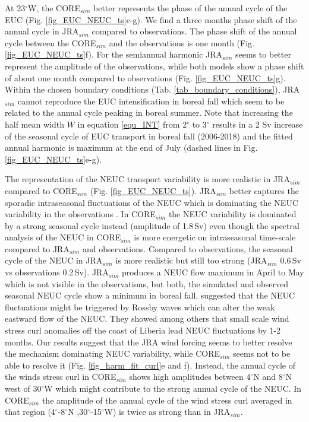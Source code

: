 \documentclass[os, manuscript]{copernicus}
\begin{document}
At 23$^{\circ}$W, the CORE$_{sim}$ better represents the phase of the annual cycle of the EUC (Fig. \ref{fig_EUC_NEUC_ts}e-g). We find a three months phase shift of the annual cycle in JRA$_{sim}$ compared to observations. The phase shift of the annual cycle between the CORE$_{sim}$ and the observations is one month (Fig. \ref{fig_EUC_NEUC_ts}f). For the semiannual harmonic JRA$_{sim}$ seems to better represent the amplitude of the observations, while both models show a phase shift of about one month compared to observations (Fig. \ref{fig_EUC_NEUC_ts}g). Within the chosen boundary conditions (Tab. \ref{tab_boundary_conditions}), JRA$_{sim}$ cannot reproduce the EUC intensification in boreal fall which seem to be related to the annual cycle peaking in boreal summer. Note that increasing the half mean width $ W $ in equation \ref{equ_INT} from 2$^{\circ}$ to 3$^{\circ}$ results in a 2 Sv increase of the seasonal cycle of EUC transport in boreal fall (2006-2018) and the fitted annual harmonic is maximum at the end of July (dashed lines in Fig. \ref{fig_EUC_NEUC_ts}e-g).

The representation of the NEUC transport variability is more realistic in JRA$_{sim}$ compared to CORE$_{sim}$ (Fig. \ref{fig_EUC_NEUC_ts}). JRA$_{sim}$ better captures the sporadic intraseasonal fluctuations of the NEUC which is dominating the NEUC variability in the observations \citep{Burmeister2020}. In CORE$_{sim}$ the NEUC variability is dominated by a strong seasonal cycle instead (amplitude of 1.8$\,$Sv) even though the spectral analysis of the NEUC in CORE$_{sim}$ is more energetic on intraseasonal time-scale compared to JRA$_{sim}$ and observations. Compared to observations, the seasonal cycle of the NEUC in JRA$_{sim}$ is more realistic but still too strong (JRA$_{sim}$ 0.6$\,$Sv vs observations 0.2$\,$Sv). JRA$_{sim}$ produces a NEUC flow maximum in April to May which is not visible in the observations, but both, the simulated and observed seasonal NEUC cycle show a minimum in boreal fall. \cite{Burmeister2020} suggested that the NEUC fluctuations might be triggered by Rossby waves which can alter the weak eastward flow of the NEUC. They showed among others that small scale wind stress curl anomalies off the coast of Liberia lead NEUC fluctuations by 1-2 months. Our results suggest that the JRA wind forcing seems to better resolve the mechanism dominating NEUC variability, while CORE$_{sim}$ seems not to be able to resolve it (Fig. \ref{fig_harm_fit_curl}e and f). Instead, the annual cycle of the winds stress curl in CORE$_{sim}$ shows high amplitudes between 4$^{\circ}$N and 8$^{\circ}$N west of 30$^{\circ}$W which might contribute to the strong annual cycle of the NEUC. In CORE$_{sim}$ the amplitude of the annual cycle of the wind stress curl averaged in that region (4$^{\circ}$-8$^{\circ}$N ,30$^{\circ}$-15$^{\circ}$W) is twice as strong than in JRA$_{sim}$.
\end{document}

